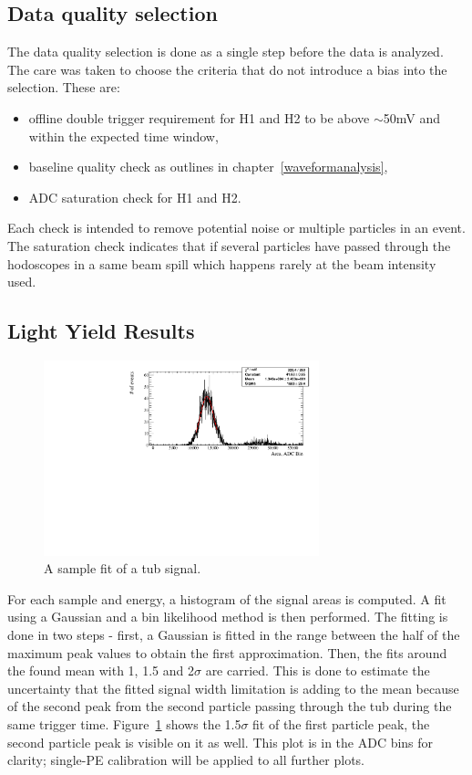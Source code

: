 \documentclass[preprint,12pt]{elsarticle}
\begin{document}
\subsection{Data quality selection}
\label{dataqualitysection}

The data quality selection is done as a single step before the data is analyzed. The care was taken to choose the criteria that do not introduce a bias into the selection. These are:

\begin{itemize}
	\item offline double trigger requirement for H1 and H2 to be above $\sim$50mV and within the expected time window,
	\item baseline quality check as outlines in chapter~\ref{waveformanalysis},
	\item ADC saturation check for H1 and H2.
\end{itemize}

Each check is intended to remove potential noise or multiple particles in an event. The saturation check indicates that if several particles have passed through the hodoscopes in a same beam spill which happens rarely at the beam intensity used.


\subsection{Light Yield Results}
\label{lightyieldsection}

\begin{figure}[ht]
	\centering
		\includegraphics[width=80mm]{sampletubsignalfit.pdf}
	\caption{A sample fit of a tub signal.}
	\label{sampletubsignalfit}
\end{figure}

For each sample and energy, a histogram of the signal areas is computed. A fit using a Gaussian and a bin likelihood method is then performed. The fitting is done in two steps - first, a Gaussian is fitted in the range between the half of the maximum peak values to obtain the first approximation. Then, the fits around the found mean with 1, 1.5 and 2$\sigma$ are carried. This is done to estimate the uncertainty that the fitted signal width limitation is adding to the mean because of the second peak from the second particle passing through the tub during the same trigger time. 
Figure~\ref{sampletubsignalfit} shows the 1.5$\sigma$ fit of the first particle peak, the second particle peak is visible on it as well. This plot is in the ADC bins for clarity; single-PE calibration will be applied to all further plots.
\end{document}
